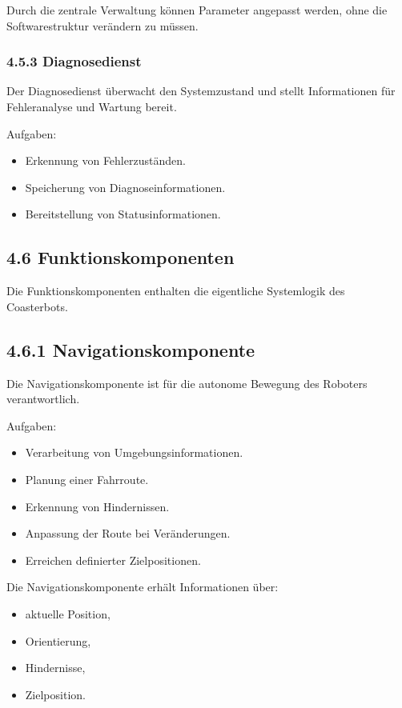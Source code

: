 \documentclass[
]{article}
\providecommand{\tightlist}{%
  \setlength{\itemsep}{0pt}\setlength{\parskip}{0pt}}
\begin{document}
Durch die zentrale Verwaltung können Parameter angepasst werden, ohne
die Softwarestruktur verändern zu müssen.

\subsubsection{4.5.3 Diagnosedienst}\label{diagnosedienst}

Der Diagnosedienst überwacht den Systemzustand und stellt Informationen
für Fehleranalyse und Wartung bereit.

Aufgaben:

\begin{itemize}
\tightlist
\item
  Erkennung von Fehlerzuständen.
\item
  Speicherung von Diagnoseinformationen.
\item
  Bereitstellung von Statusinformationen.
\end{itemize}

\subsection{4.6 Funktionskomponenten}\label{funktionskomponenten}

Die Funktionskomponenten enthalten die eigentliche Systemlogik des
Coasterbots.

\subsection{4.6.1 Navigationskomponente}\label{navigationskomponente-1}

Die Navigationskomponente ist für die autonome Bewegung des Roboters
verantwortlich.

Aufgaben:

\begin{itemize}
\tightlist
\item
  Verarbeitung von Umgebungsinformationen.
\item
  Planung einer Fahrroute.
\item
  Erkennung von Hindernissen.
\item
  Anpassung der Route bei Veränderungen.
\item
  Erreichen definierter Zielpositionen.
\end{itemize}

Die Navigationskomponente erhält Informationen über:

\begin{itemize}
\tightlist
\item
  aktuelle Position,
\item
  Orientierung,
\item
  Hindernisse,
\item
  Zielposition.
\end{itemize}
\end{document}
